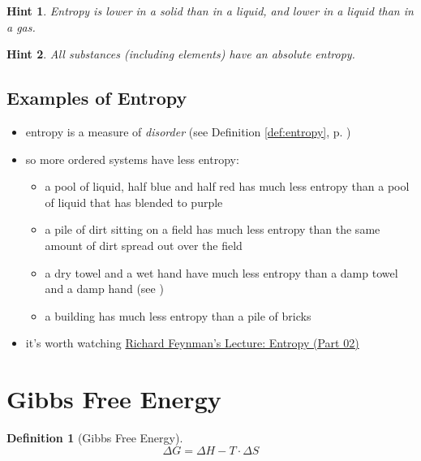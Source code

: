 \documentclass[11pt, oneside]{article}   	%
\newtheorem{definition}{Definition}
\newtheorem{hint}{Hint}
\begin{document}
\begin{hint}\label{hint:entropy-by-state}
Entropy is lower in a solid than in a liquid, and lower in a liquid than in a gas.
\end{hint}

\begin{hint}\label{hint:absolute-entropy}
All substances (including elements) have an absolute entropy.
\end{hint}

\subsection{Examples of Entropy}

\begin{itemize}
\item entropy is a measure of \emph{disorder} (see Definition \ref{def:entropy}, p. \pageref{def:entropy})
\item so more ordered systems have less entropy:
\begin{itemize}
\item a pool of liquid, half blue and half red has much less entropy than a pool of liquid that has blended to purple
\item a pile of dirt sitting on a field has much less entropy than the same amount of dirt spread out over the field
\item a dry towel and a wet hand have much less entropy than a damp towel and a damp hand (see \cite{feynman-entropy-lecture-video} )
\item a building has much less entropy than a pile of bricks
\end{itemize}
\item it's worth watching \href{https://youtu.be/iwarN7Kka5k?si=DG0EJ9OhzwZCMGy4}{Richard Feynman's Lecture: Entropy (Part 02)}
\end{itemize}

\section{Gibbs Free Energy}

\begin{definition}[Gibbs Free Energy]\label{def:gibbs-free-energy}
$$\Delta G = \Delta H - T \cdot \Delta S$$
\end{definition}
\end{document}
